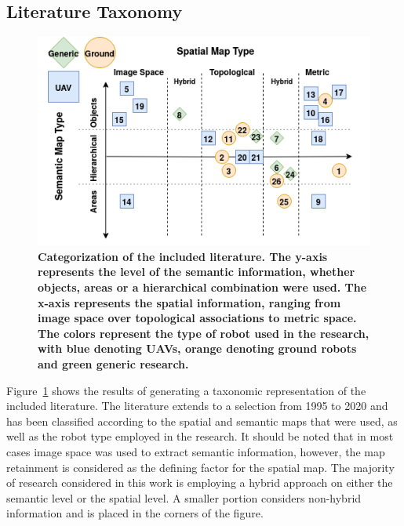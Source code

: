 \documentclass[twocolumn,letterpaper]{IEEEAerospaceCLS}  %
\begin{document}
\subsection{Literature Taxonomy} \label{ssec:ResLit}
\begin{figure}
    \centering
    \includegraphics[width=\textwidth]{Lit-13.png}
    \caption{\bf{
        Categorization of the included literature. The y-axis represents the level of the semantic information, whether objects, areas or a hierarchical combination were used. The x-axis represents the spatial information, ranging from image space over topological associations to metric space. The colors represent the type of robot used in the research, with blue denoting UAVs, orange denoting ground robots and green generic research.
    }}
    \label{fig:LitRes}
\end{figure}
Figure~\ref{fig:LitRes} shows the results of generating a taxonomic representation of the included literature. The literature extends to a selection from 1995 to 2020 and has been classified according to the spatial and semantic maps that were used, as well as the robot type employed in the research. It should be noted that in most cases image space was used to extract semantic information, however, the map retainment is considered as the defining factor for the spatial map. The majority  of research considered in this work is employing a hybrid approach on either the semantic level or the spatial level. A smaller portion considers non-hybrid information and is placed in the corners of the figure.  
\end{document}
